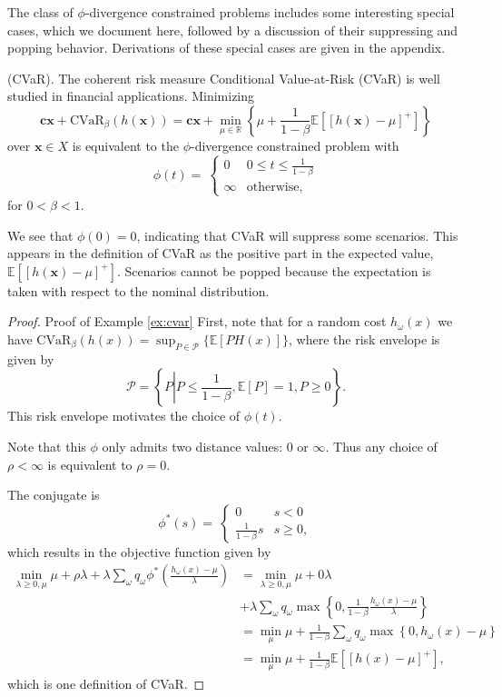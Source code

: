 \documentclass[opre,nonblindrev]{informs3} %
\newcommand{\R}{{\mathbb{R}}}
\newcommand{\E}{\mathbb{E}}
\newcommand{\e}[1]{\E \left[ #1 \right]}
\newcommand{\x}{\mathbf{x}}
\renewcommand{\c}{\mathbf{c}}
\begin{document}
The class of $\phi$-divergence constrained problems includes some interesting special cases, which we document here, followed by a discussion of their suppressing and popping behavior.
Derivations of these special cases are given in the appendix.

\begin{example}{(CVaR).}
	\label{ex:cvar}
	The coherent risk measure Conditional Value-at-Risk (CVaR) is well studied in financial applications.
	Minimizing
	\[
		\c\x + \text{CVaR}_\beta(h(\x)) = \c\x + \min_{\mu \in \R} \left\{ \mu + \frac{1}{1-\beta}\e{\left[h(\x)-\mu\right]^+} \right\}
	\]
	over $\x \in X$ is equivalent to the $\phi$-divergence constrained problem with
	\[
		\phi(t) = \
		\begin{cases}
			0 & 0 \leq t \leq \frac{1}{1-\beta} \\
			\infty & \text{otherwise},
		\end{cases}
	\]
	for $0 < \beta < 1$.

	We see that $\phi(0) = 0$, indicating that CVaR will suppress some scenarios.
	This appears in the definition of CVaR as the positive part in the expected value, $\e{[h(\x)-\mu]^+}$.
	Scenarios cannot be popped because the expectation is taken with respect to the nominal distribution.
\end{example}

\begin{proof}{\sc Proof of Example \ref{ex:cvar}}
	First, note that for a random cost $h_\omega(x)$ we have $\mbox{CVaR}_\beta(h(x)) = \sup_{P \in \mathcal{P}} \{\e{PH(x)}\}$, where the risk envelope is given by
	\[
		\mathcal{P} = \left\{ P \left| P \leq \frac{1}{1-\beta}, \e{P} = 1, P \geq 0 \right.\right\}.
	\]
	This risk envelope motivates the choice of $\phi(t)$.
	
	Note that this $\phi$ only admits two distance values: $0$ or $\infty$.
	Thus any choice of $\rho < \infty$ is equivalent to $\rho = 0$.
	
	The conjugate is
	\[
	\phi^*(s) = \
		\begin{cases}
			0 & s < 0 \\
			\frac{1}{1-\beta} s & s \geq 0,
		\end{cases}
	\]
	which results in the objective function given by
	\begin{align*}
		\min_{\lambda \geq 0,\mu} \mu + \rho \lambda + \lambda \sum_\omega q_\omega \phi^*\left( \frac{h_\omega(x)-\mu}{\lambda} \right) & = \min_{\lambda \geq 0, \mu} \mu + 0\lambda \\
		& + \lambda \sum_\omega q_\omega \max\left\{ 0, \frac{1}{1-\beta} \frac{h_\omega(x)-\mu}{\lambda} \right\} \\
		& = \min_{\mu} \mu + \frac{1}{1-\beta} \sum_\omega q_\omega \max\left\{ 0, h_\omega(x)-\mu \right\} \\
		& = \min_{\mu} \mu + \frac{1}{1-\beta} \e{[h(x)-\mu]^+},
	\end{align*}
	which is one definition of CVaR.
\end{proof}
\end{document}
